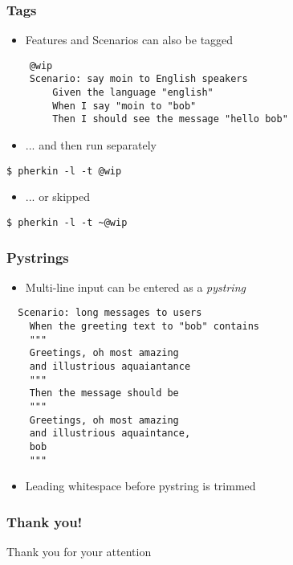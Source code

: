 \documentclass[10pt]{vcs_beamer}
\begin{document}
\begin{frame}[fragile]
\frametitle{Tags}

\begin{itemize}
    \item Features and Scenarios can also be tagged
\end{itemize}

\begin{lstlisting}
    @wip
    Scenario: say moin to English speakers
        Given the language "english"
        When I say "moin to "bob"
        Then I should see the message "hello bob"
\end{lstlisting}

\begin{itemize}
    \item ... and then run separately
\end{itemize}
\begin{lstlisting}
$ pherkin -l -t @wip
\end{lstlisting}

\begin{itemize}
    \item ... or skipped
\end{itemize}
\begin{lstlisting}
$ pherkin -l -t ~@wip
\end{lstlisting}

\end{frame}

\begin{frame}[fragile]
\frametitle{Pystrings}

\begin{itemize}
    \item Multi-line input can be entered as a \emph{pystring}
\end{itemize}

\begin{lstlisting}
  Scenario: long messages to users
    When the greeting text to "bob" contains
    """
    Greetings, oh most amazing
    and illustrious aquaiantance
    """
    Then the message should be
    """
    Greetings, oh most amazing
    and illustrious aquaintance,
    bob
    """
\end{lstlisting}

\begin{itemize}
    \item Leading whitespace before pystring is trimmed
\end{itemize}

\end{frame}

\begin{frame}
\frametitle{Thank you!}

\vspace*{2cm}
\begin{center}
    \LARGE
Thank you for your attention \ttt{:-)}
\end{center}

\end{frame}
\end{document}
